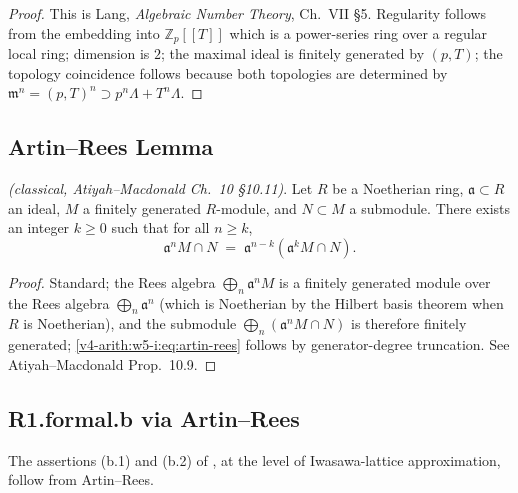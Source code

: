 \begin{proof}
This is Lang, \emph{Algebraic Number Theory}, Ch.~VII \S5. Regularity
follows from the embedding into \(\mathbb{Z}_{p}[[T]]\) which is a
power-series ring over a regular local ring; dimension is \(2\); the
maximal ideal is finitely generated by \((p,T)\); the topology
coincidence follows because both topologies are determined by
\(\mathfrak{m}^{n}=(p,T)^{n}\supset p^{n}\Lambda+T^{n}\Lambda\).
\end{proof}

\subsection{Artin--Rees Lemma}
\label{v4-arith:w5-i:artin-rees}

\begin{lemma}
\label{v4-arith:w5-i:lem:artin-rees}
\ClaimStatusProvedHere \emph{(classical, Atiyah--Macdonald
Ch.~10 \S10.11)}. Let \(R\) be a Noetherian ring, \(\mathfrak{a}\subset R\)
an ideal, \(M\) a finitely generated \(R\)-module, and \(N\subset M\) a
submodule. There exists an integer \(k\geq 0\) such that for all
\(n\geq k\),
\begin{equation}
\label{v4-arith:w5-i:eq:artin-rees}
\mathfrak{a}^{n}M\cap N\;=\;\mathfrak{a}^{n-k}(\mathfrak{a}^{k}M\cap N).
\end{equation}
\end{lemma}

\begin{proof}
Standard; the Rees algebra \(\bigoplus_{n}\mathfrak{a}^{n}M\) is a
finitely generated module over the Rees algebra
\(\bigoplus_{n}\mathfrak{a}^{n}\) (which is Noetherian by the
Hilbert basis theorem when \(R\) is Noetherian), and the submodule
\(\bigoplus_{n}(\mathfrak{a}^{n}M\cap N)\) is therefore finitely
generated; \eqref{v4-arith:w5-i:eq:artin-rees} follows by
generator-degree truncation. See Atiyah--Macdonald Prop.~10.9.
\end{proof}

\subsection{R1.formal.b via Artin--Rees}
\label{v4-arith:w5-i:R1-formal-b-closure}

The assertions (b.1) and (b.2) of
, at the level of
Iwasawa-lattice approximation, follow from Artin--Rees.


